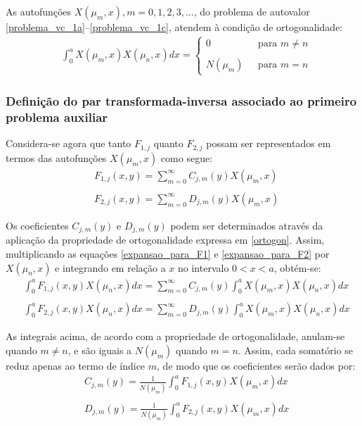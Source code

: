 As autofunções $X(\mu_m, x), m=0,1,2,3,\ldots$, do problema de autovalor \eqref{problema_vc_1a}--\eqref{problema_vc_1c}, atendem à condição de ortogonalidade:
\begin{align}
& \int_0^a X(\mu_m, x)X(\mu_n, x)dx 
= \left\lbrace
\begin{array}{ll}
0 \quad\quad\quad\quad & \text{para  } m \neq n \\ \\
N(\mu_m) & \text{para  }m = n
\end{array}
\right. \label{ortogon}
\end{align}

\subsubsection{Definição do par transformada-inversa associado ao primeiro problema auxiliar}

Considera-se agora que tanto $F_{1, j}$ quanto $F_{2, j}$ possam ser representados em termos das autofunções $X(\mu_m, x)$ como segue:
\begin{align}
& F_{1, j}(x, y) = \sum_{m=0}^\infty C_{j,m}(y)X(\mu_m, x) \label{expansao_para_F1}\\ \nonumber \\
& F_{2, j}(x, y) = \sum_{m=0}^\infty D_{j,m}(y)X(\mu_m, x) \label{expansao_para_F2}
\end{align}

Os coeficientes $C_{j,m}(y)$ e $D_{j,m}(y)$ podem ser determinados através da aplicação da propriedade de ortogonalidade expressa em \eqref{ortogon}. Assim, multiplicando as equações
\eqref{expansao_para_F1} e \eqref{expansao_para_F2} por $X(\mu_n, x)$ e integrando em relação a $x$ no intervalo $0 < x < a$, obtém-se:
\begin{align}
& \int_0^a F_{1, j}(x, y)X(\mu_n, x)dx = \sum_{m=0}^\infty C_{j,m}(y) \int_0^a X(\mu_m, x)X(\mu_n, x)dx \label{somatorio_para_F1}\\ \nonumber \\
& \int_0^a F_{2, j}(x, y)X(\mu_n, x)dx = \sum_{m=0}^\infty D_{j,m}(y) \int_0^a X(\mu_m, x)X(\mu_n, x)dx \label{somatorio_para_F2}
\end{align}

As integrais acima, de acordo com a propriedade de ortogonalidade, anulam-se quando $m \ne n$, e são iguais a $N(\mu_m)$ quando $m = n$. Assim, cada somatório se reduz apenas ao
termo de índice $m$, de modo que os coeficientes serão dados por:
\begin{align}
& C_{j,m}(y) = \frac{1}{N(\mu_m)}\int_0^a F_{1, j}(x, y)X(\mu_m, x)dx \label{coef_para_F1}\\ \nonumber \\
& D_{j,m}(y) = \frac{1}{N(\mu_m)}\int_0^a F_{2, j}(x, y)X(\mu_m, x)dx \label{coef_para_F2}
\end{align}

